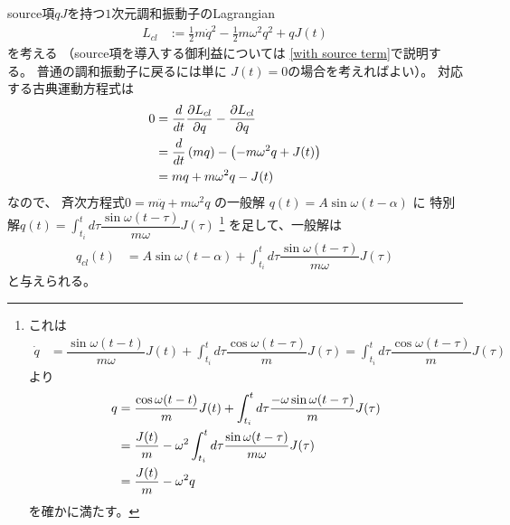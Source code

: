 source項$qJ$を持つ$1$次元調和振動子のLagrangian
\begin{align}
    L_{cl}
    &:=
    \frac{1}{2}m\dot{q}^2
    -
    \frac{1}{2}m\omega^2q^2
    +
    qJ(t)
\end{align}
を考える
（source項を導入する御利益については
\ref{with source term}で説明する。
普通の調和振動子に戻るには単に
$J(t) = 0$の場合を考えればよい）。
対応する古典運動方程式は
\begin{align}
    0
    &=
    \frac{d}{dt}
    \frac{\partial L_{cl}}{\partial \dot{q}}
    -
    \frac{\partial L_{cl}}{\partial q}
\notag\\&=
    \frac{d}{dt}
    \left(
        m\dot{q}
    \right)
    -
    \left(
        -
        m\omega^2q
        +
        J(t)
    \right)
\notag\\&=
    m\ddot{q}
    +
    m\omega^2q
    -
    J(t)
\end{align}
なので、
斉次方程式$0 = m \ddot{q} + m \omega^2 q$
の一般解
$q(t) = A \sin \omega (t - \alpha)$
に
特別解$
    q(t) = \int_{t_i}^t
    d\tau
    \dfrac{ \sin \omega (t-\tau) }{
        m \omega
    }
    J(\tau)
$
\footnote{
    これは
    \begin{align}
        \dot{q}
    &=
        \dfrac{ \sin \omega (t-t) }{ m \omega }
        J(t)
        +
        \int_{t_i}^t d\tau
            \dfrac{ \cos \omega (t-\tau) }{ m }
            J(\tau)
    =
        \int_{t_i}^t d\tau
            \dfrac{ \cos \omega (t-\tau) }{ m }
            J(\tau)
    \end{align}
    より
    \begin{align}
        \ddot{q}
        &=
        \dfrac{ \cos \omega (t-t) }{ m }
        J(t)
        +
        \int_{t_i}^t d\tau
        \dfrac{ - \omega \sin \omega (t-\tau) }{m}
        J(\tau)
    \notag\\&=
        \dfrac{J(t)}{m}
        -
        \omega^2\int_{t_i}^t d\tau
        \dfrac{ \sin \omega (t-\tau) }{m \omega}
        J(\tau)
    \notag\\&=
        \dfrac{ J(t) }{m}
        -
        \omega^2 q
    \end{align}
    を確かに満たす。
}
を足して、一般解は
\begin{align}
    q_{cl}(t)
    &=
    A \sin \omega (t-\alpha)
    +
    \int_{t_i}^t d\tau
    \dfrac{ \sin \omega (t-\tau) }{m\omega}
    J(\tau)
\end{align}
と与えられる。

